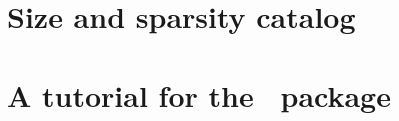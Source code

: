 	\section{Size and sparsity catalog} \label{sec:instance_size_sparsity}
	
	
	\section{A tutorial for the \julia\ package} \label{sec:tutorial}
	
	
	
	



